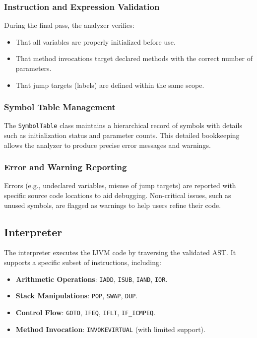 \documentclass[11pt]{article}
\begin{document}
\subsubsection{Instruction and Expression Validation}
During the final pass, the analyzer verifies:
\begin{itemize}
    \item That all variables are properly initialized before use.
    \item That method invocations target declared methods with the correct number of parameters.
    \item That jump targets (labels) are defined within the same scope.
\end{itemize}

\subsubsection{Symbol Table Management}
The \texttt{SymbolTable} class maintains a hierarchical record of symbols with details such as initialization status and parameter counts. This detailed bookkeeping allows the analyzer to produce precise error messages and warnings.

\subsubsection{Error and Warning Reporting}
Errors (e.g., undeclared variables, misuse of jump targets) are reported with specific source code locations to aid debugging. Non-critical issues, such as unused symbols, are flagged as warnings to help users refine their code.

\subsection{Interpreter}
The interpreter executes the IJVM code by traversing the validated AST. It supports a specific subset of instructions, including:

\begin{itemize}
    \item \textbf{Arithmetic Operations}: \texttt{IADD}, \texttt{ISUB}, \texttt{IAND}, \texttt{IOR}.
    \item \textbf{Stack Manipulations}: \texttt{POP}, \texttt{SWAP}, \texttt{DUP}.
    \item \textbf{Control Flow}: \texttt{GOTO}, \texttt{IFEQ}, \texttt{IFLT}, \texttt{IF\_ICMPEQ}.
    \item \textbf{Method Invocation}: \texttt{INVOKEVIRTUAL} (with limited support).
\end{itemize}
\end{document}
